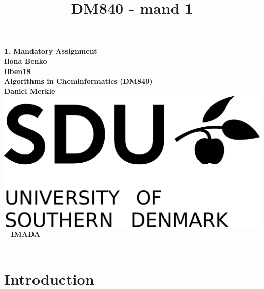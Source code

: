 \documentclass[a4paper,10pt,titlepage]{report}
\date{}
\title{DM840 - mand 1}
\begin{document}
\begin{titlepage}
\centering
    \vspace*{9\baselineskip}
    \huge
    \bfseries
    1. Mandatory Assignment \\
    \normalfont
    Ilona Benko \\
    Ilben18 \\
	\huge
    Algorithms in Cheminformatics (DM840)  \\
    Daniel Merkle \\[4\baselineskip]
    \normalfont
	\includegraphics[scale=1]{SDU_logo}
    \vfill\
    \vspace{5mm}
    IMADA \\

    \textbf{\datedate}  \bf \\[2\baselineskip]
\end{titlepage}

\renewcommand{\thepage}{\roman{page}}%
\tableofcontents
\newpage
\setcounter{page}{1}
\renewcommand{\thepage}{\arabic{page}}

\section {Introduction}
\end{document}
